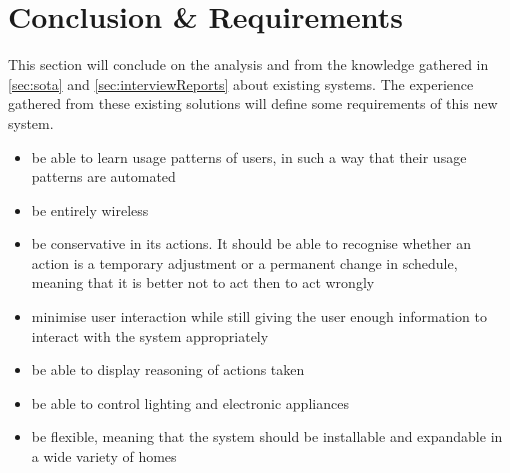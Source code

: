 \section{Conclusion \& Requirements}\label{sec:requirements}
This section will conclude on the analysis and from the knowledge gathered in \cref{sec:sota} and \cref{sec:interviewReports} about existing systems. The experience gathered from these existing solutions will define some requirements of this new system.

\begin{itemize}
\item be able to learn usage patterns of users, in such a way that their usage patterns are automated
\item be entirely wireless
\item be conservative in its actions. It should be able to recognise whether an action is a temporary adjustment or a permanent change in schedule, meaning that it is better not to act then to act wrongly
\item minimise user interaction while still giving the user enough information to interact with the system appropriately
\item be able to display reasoning of actions taken
\item be able to control lighting and electronic appliances
\item be flexible, meaning that the system should be installable and expandable in a wide variety of homes
\end{itemize}

